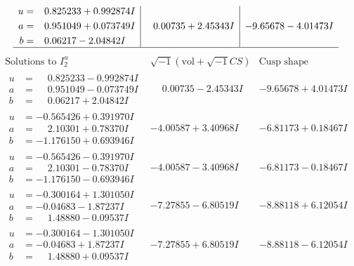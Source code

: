 \documentclass[1p]{elsarticle_modified}
\theoremstyle{definition}
\newcommand{\I}{\sqrt{-1}}
\begin{document}
$$\begin{array}{c|c|c}
\begin{aligned}
u &= \phantom{-}0.825233 + 0.992874 I \\
a &= \phantom{-}0.951049 + 0.073749 I \\
b &= \phantom{-}0.06217 - 2.04842 I\end{aligned}
 & \phantom{-}0.00735 + 2.45343 I & -9.65678 - 4.01473 I\\
 \hline 
 \end{array}$$\newpage$$\begin{array}{c|c|c}  
\text{Solutions to }I^u_{2}& \I (\text{vol} + \sqrt{-1}CS) & \text{Cusp shape}\\
 \hline 
\begin{aligned}
u &= \phantom{-}0.825233 - 0.992874 I \\
a &= \phantom{-}0.951049 - 0.073749 I \\
b &= \phantom{-}0.06217 + 2.04842 I\end{aligned}
 & \phantom{-}0.00735 - 2.45343 I & -9.65678 + 4.01473 I \\ \hline\begin{aligned}
u &= -0.565426 + 0.391970 I \\
a &= \phantom{-}2.10301 + 0.78370 I \\
b &= -1.176150 + 0.693946 I\end{aligned}
 & -4.00587 + 3.40968 I & -6.81173 + 0.18467 I \\ \hline\begin{aligned}
u &= -0.565426 - 0.391970 I \\
a &= \phantom{-}2.10301 - 0.78370 I \\
b &= -1.176150 - 0.693946 I\end{aligned}
 & -4.00587 - 3.40968 I & -6.81173 - 0.18467 I \\ \hline\begin{aligned}
u &= -0.300164 + 1.301050 I \\
a &= -0.04683 - 1.87237 I \\
b &= \phantom{-}1.48880 - 0.09537 I\end{aligned}
 & -7.27855 - 6.80519 I & -8.88118 + 6.12054 I \\ \hline\begin{aligned}
u &= -0.300164 - 1.301050 I \\
a &= -0.04683 + 1.87237 I \\
b &= \phantom{-}1.48880 + 0.09537 I\end{aligned}
 & -7.27855 + 6.80519 I & -8.88118 - 6.12054 I \\ \hline\begin{aligned}

\end{aligned}
\end{array}$$
\end{document}
